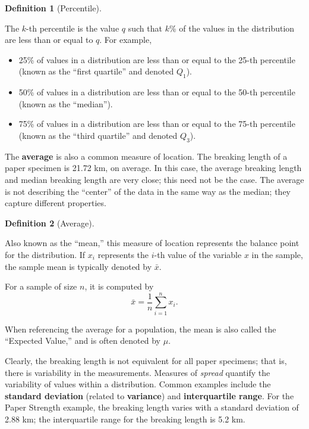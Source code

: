 \documentclass[
  letterpaper,
  DIV=11,
  numbers=noendperiod]{scrreprt}
\providecommand{\tightlist}{%
  \setlength{\itemsep}{0pt}\setlength{\parskip}{0pt}}\usepackage{longtable,booktabs,array}
\theoremstyle{definition}
\newtheorem{definition}{Definition}[chapter]
\theoremstyle{plain}
\theoremstyle{definition}
\theoremstyle{remark}
\begin{document}
\begin{definition}[Percentile]\protect\hypertarget{def-percentile}{}\label{def-percentile}

The \(k\)-th percentile is the value \(q\) such that \(k\)\% of the
values in the distribution are less than or equal to \(q\). For example,

\begin{itemize}
\tightlist
\item
  25\% of values in a distribution are less than or equal to the 25-th
  percentile (known as the ``first quartile'' and denoted \(Q_1\)).
\item
  50\% of values in a distribution are less than or equal to the 50-th
  percentile (known as the ``median'').
\item
  75\% of values in a distribution are less than or equal to the 75-th
  percentile (known as the ``third quartile'' and denoted \(Q_3\)).
\end{itemize}

\end{definition}

The \textbf{average} is also a common measure of location. The breaking
length of a paper specimen is 21.72 km, on average. In this case, the
average breaking length and median breaking length are very close; this
need not be the case. The average is not describing the ``center'' of
the data in the same way as the median; they capture different
properties.

\begin{definition}[Average]\protect\hypertarget{def-average}{}\label{def-average}

Also known as the ``mean,'' this measure of location represents the
balance point for the distribution. If \(x_i\) represents the \(i\)-th
value of the variable \(x\) in the sample, the sample mean is typically
denoted by \(\bar{x}\).

For a sample of size \(n\), it is computed by
\[\bar{x} = \frac{1}{n}\sum_{i=1}^{n} x_i.\]

When referencing the average for a population, the mean is also called
the ``Expected Value,'' and is often denoted by \(\mu\).

\end{definition}

Clearly, the breaking length is not equivalent for all paper specimens;
that is, there is variability in the measurements. Measures of
\emph{spread} quantify the variability of values within a distribution.
Common examples include the \textbf{standard deviation} (related to
\textbf{variance}) and \textbf{interquartile range}. For the Paper
Strength example, the breaking length varies with a standard deviation
of 2.88 km; the interquartile range for the breaking length is 5.2 km.
\end{document}
